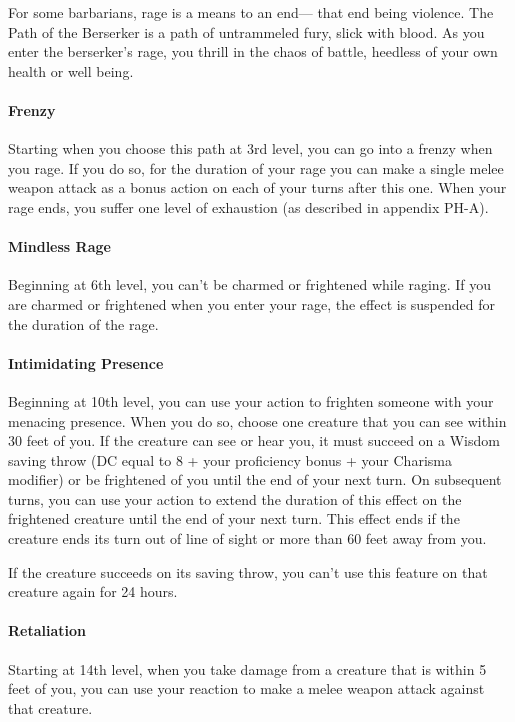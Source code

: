 \documentclass[
]{article}
\begin{document}
For some barbarians, rage is a means to an end--- that end being
violence. The Path of the Berserker is a path of untrammeled fury, slick
with blood. As you enter the berserker's rage, you thrill in the chaos
of battle, heedless of your own health or well being.

\hypertarget{frenzy}{%
\paragraph{Frenzy}\label{frenzy}}

Starting when you choose this path at 3rd level, you can go into a
frenzy when you rage. If you do so, for the duration of your rage you
can make a single melee weapon attack as a bonus action on each of your
turns after this one. When your rage ends, you suffer one level of
exhaustion (as described in appendix PH-A).

\hypertarget{mindless-rage}{%
\paragraph{Mindless Rage}\label{mindless-rage}}

Beginning at 6th level, you can't be charmed or frightened while raging.
If you are charmed or frightened when you enter your rage, the effect is
suspended for the duration of the rage.

\hypertarget{intimidating-presence}{%
\paragraph{Intimidating Presence}\label{intimidating-presence}}

Beginning at 10th level, you can use your action to frighten someone
with your menacing presence. When you do so, choose one creature that
you can see within 30 feet of you. If the creature can see or hear you,
it must succeed on a Wisdom saving throw (DC equal to 8 + your
proficiency bonus + your Charisma modifier) or be frightened of you
until the end of your next turn. On subsequent turns, you can use your
action to extend the duration of this effect on the frightened creature
until the end of your next turn. This effect ends if the creature ends
its turn out of line of sight or more than 60 feet away from you.

If the creature succeeds on its saving throw, you can't use this feature
on that creature again for 24 hours.

\hypertarget{retaliation}{%
\paragraph{Retaliation}\label{retaliation}}

Starting at 14th level, when you take damage from a creature that is
within 5 feet of you, you can use your reaction to make a melee weapon
attack against that creature.
\end{document}
